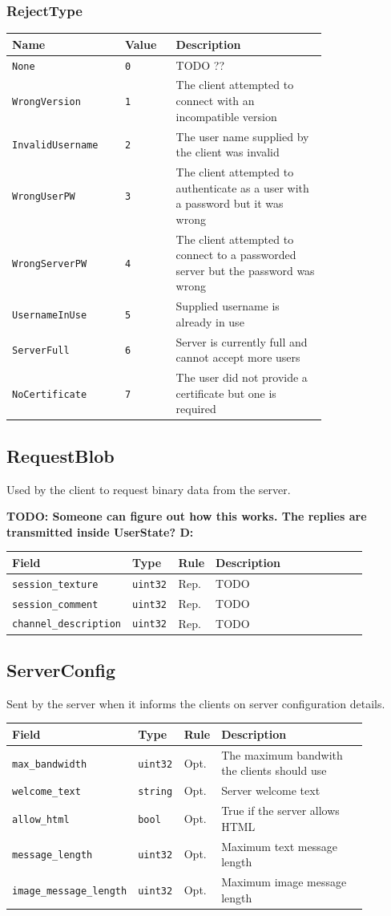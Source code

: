 \documentclass[11pt]{article} %
\newenvironment{mumbleMessageEx}
{%
	\small
	\renewcommand\arraystretch{1.5}
	\begin{tabular}{p{0.25\linewidth}p{0.13\linewidth}p{0.05\linewidth}p{0.45\linewidth}}
	Field & Type & Rule & Description \\
	\hline
}
{%
	\end{tabular}
	\renewcommand\arraystretch{1.0}
}
\newcommand{\mumbleMessageExItem}[4]{ \texttt{#1} & \texttt{#2} & #3 & #4 \\ }
\newenvironment{mumbleEnum}
{%
	\small
	\renewcommand\arraystretch{1.5}
	\begin{tabular}{p{0.25\linewidth}p{0.13\linewidth}p{0.4\linewidth}}
	Name & Value & Description \\
	\hline
}
{%
	\end{tabular}
	\renewcommand\arraystretch{1.0}
}
\newcommand{\mumbleEnumItem}[3]{ \texttt{#1} & \texttt{#2} & #3 \\ }
\begin{document}
\subsubsection{RejectType}
\begin{mumbleEnum}
\mumbleEnumItem{None}{0}{TODO ??}
\mumbleEnumItem{WrongVersion}{1}{The client attempted to connect with an incompatible version}
\mumbleEnumItem{InvalidUsername}{2}{The user name supplied by the client was invalid}
\mumbleEnumItem{WrongUserPW}{3}{The client attempted to authenticate as a user with a password but it was wrong}
\mumbleEnumItem{WrongServerPW}{4}{The client attempted to connect to a passworded server but the password was wrong}
\mumbleEnumItem{UsernameInUse}{5}{Supplied username is already in use}
\mumbleEnumItem{ServerFull}{6}{Server is currently full and cannot accept more users}
\mumbleEnumItem{NoCertificate}{7}{The user did not provide a certificate but one is required}
\end{mumbleEnum}

\subsection{RequestBlob}

Used by the client to request binary data from the server.

\textbf{TODO: Someone can figure out how this works. The replies are transmitted inside UserState? D:}

\begin{mumbleMessageEx}
\mumbleMessageExItem{session\_texture}{uint32}{Rep.}{TODO}
\mumbleMessageExItem{session\_comment}{uint32}{Rep.}{TODO}
\mumbleMessageExItem{channel\_description}{uint32}{Rep.}{TODO}
\end{mumbleMessageEx}

\subsection{ServerConfig}

Sent by the server when it informs the clients on server configuration details.

\begin{mumbleMessageEx}
\mumbleMessageExItem{max\_bandwidth}{uint32}{Opt.}{The maximum bandwith the clients should use}
\mumbleMessageExItem{welcome\_text}{string}{Opt.}{Server welcome text}
\mumbleMessageExItem{allow\_html}{bool}{Opt.}{True if the server allows HTML}
\mumbleMessageExItem{message\_length}{uint32}{Opt.}{Maximum text message length}
\mumbleMessageExItem{image\_message\_length}{uint32}{Opt.}{Maximum image message length}
\end{mumbleMessageEx}
\end{document}
